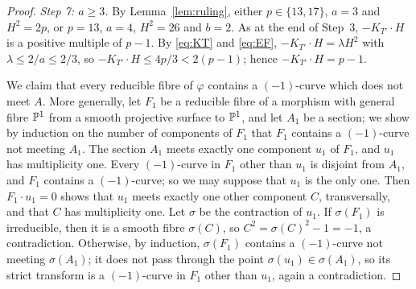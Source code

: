 \begin{proof}
\emph{Step 7: $a\geq 3$.}
By Lemma~\ref{lem:ruling}, either $p\in\{13,17\}$, $a = 3$ and $H^2 = 2p$, or $p = 13$, $a = 4$, $H^2 = 26$ and $b = 2$.
As at the end of Step~3, $-K_{T'}\cdot H$ is a positive multiple of $p-1$.
By \eqref{eq:KT} and \eqref{eq:EF}, $-K_{T'}\cdot H = \lambda H^2$ with $\lambda\leq 2/a\leq 2/3$, so $-K_{T'}\cdot H\leq 4p/3<2(p-1)$; hence $-K_{T'}\cdot H = p-1$.

We claim that every reducible fibre of $\varphi$ contains a $(-1)$-curve which does not meet $A$.
More generally, let $F_1$ be a reducible fibre of a morphism with general fibre $\mathbb{P}^1$ from a smooth projective surface to $\mathbb{P}^1$, and let $A_1$ be a section; we show by induction on the number of components of $F_1$ that $F_1$ contains a $(-1)$-curve not meeting $A_1$.
The section $A_1$ meets exactly one component $u_1$ of $F_1$, and $u_1$ has multiplicity one.
Every $(-1)$-curve in $F_1$ other than $u_1$ is disjoint from $A_1$, and $F_1$ contains a $(-1)$-curve; so we may suppose that $u_1$ is the only one.
Then $F_1\cdot u_1 = 0$ shows that $u_1$ meets exactly one other component $C$, transversally, and that $C$ has multiplicity one.
Let $\sigma$ be the contraction of $u_1$.
If $\sigma(F_1)$ is irreducible, then it is a smooth fibre $\sigma(C)$, so $C^2 = \sigma(C)^2-1 = -1$, a contradiction.
Otherwise, by induction, $\sigma(F_1)$ contains a $(-1)$-curve not meeting $\sigma(A_1)$; it does not pass through the point $\sigma(u_1)\in\sigma(A_1)$, so its strict transform is a $(-1)$-curve in $F_1$ other than $u_1$, again a contradiction.


\end{proof}

